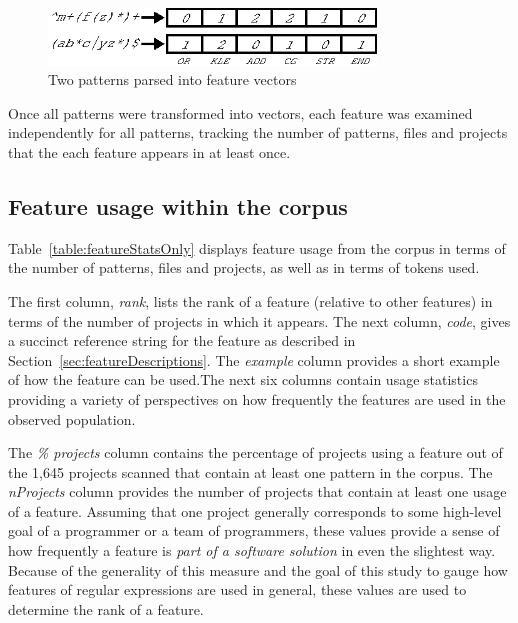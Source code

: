 \begin{figure}[tb]
\centering
\includegraphics[height=0.6in]{nontex/illustrations/featureParsing.eps}
\caption{Two patterns parsed into feature vectors}
\label{fig:featureParsing}
\vspace{-12pt}
\end{figure}

Once all patterns were transformed into vectors, each feature was examined independently for all patterns, tracking the number of patterns, files and projects that the each feature appears in at least once.



\subsection{Feature usage within the corpus}
Table~\ref{table:featureStatsOnly} displays feature usage from the corpus in terms of the number of patterns, files and projects, as well as in terms of tokens used.

The first column, \emph{rank}, lists the rank of a feature (relative to other features) in terms of the number of projects in which it appears. The next column, \emph{code}, gives a succinct reference string for the feature as described in Section~\ref{sec:featureDescriptions}. The \emph{example} column provides a short example of how the feature can be used.The next six columns contain usage statistics providing a variety of perspectives on how frequently the features are used in the observed population.

The \emph{\% projects} column contains the percentage of projects  using a feature out of the 1,645 projects scanned that contain at least one pattern in the corpus.  The \emph{nProjects} column provides the number of projects that contain at least one usage of a feature.  Assuming that one project generally corresponds to some high-level goal of a programmer or a team of programmers, these values provide a sense of how frequently a feature is \emph{part of a software solution} in even the slightest way.  Because of the generality of this measure and the goal of this study to gauge how features of regular expressions are used in general, these values are used to determine the rank of a feature.

